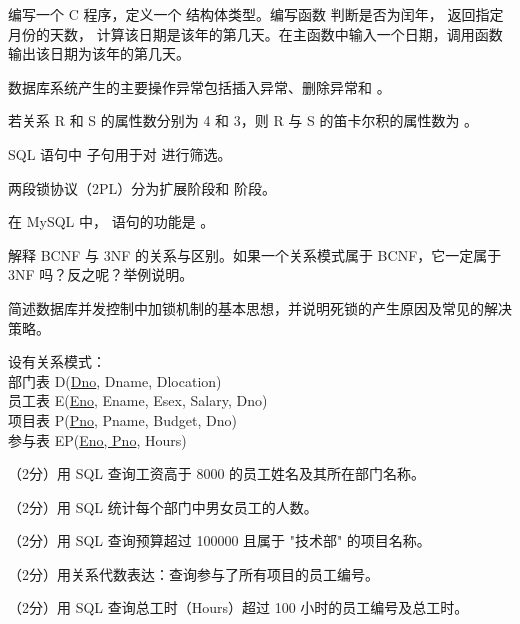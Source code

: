 \documentclass[a4paper,11pt]{article}
\begin{document}
\pq 编写一个 C 程序，定义一个  结构体类型。编写函数  判断是否为闰年， 返回指定月份的天数， 计算该日期是该年的第几天。在主函数中输入一个日期，调用函数输出该日期为该年的第几天。
\anslines{6cm}



\q 数据库系统产生的主要操作异常包括插入异常、删除异常和 \fillblank 。

\q 若关系 R 和 S 的属性数分别为 4 和 3，则 R 与 S 的笛卡尔积的属性数为 \fillblank 。

\q SQL 语句中  子句用于对 \fillblank 进行筛选。

\q 两段锁协议（2PL）分为扩展阶段和 \fillblank 阶段。

\q 在 MySQL 中， 语句的功能是 \fillblank 。


\q 解释 BCNF 与 3NF 的关系与区别。如果一个关系模式属于 BCNF，它一定属于 3NF 吗？反之呢？举例说明。
\anslines{3cm}

\q 简述数据库并发控制中加锁机制的基本思想，并说明死锁的产生原因及常见的解决策略。
\anslines{3cm}


设有关系模式：\\
部门表 D(\underline{Dno}, Dname, Dlocation)\\
员工表 E(\underline{Eno}, Ename, Esex, Salary, Dno)\\
项目表 P(\underline{Pno}, Pname, Budget, Dno)\\
参与表 EP(\underline{Eno, Pno}, Hours)

\q （2分）用 SQL 查询工资高于 8000 的员工姓名及其所在部门名称。
\anslines{0.8cm}

\q （2分）用 SQL 统计每个部门中男女员工的人数。
\anslines{0.8cm}

\q （2分）用 SQL 查询预算超过 100000 且属于 "技术部" 的项目名称。
\anslines{0.8cm}

\q （2分）用关系代数表达：查询参与了所有项目的员工编号。
\anslines{1.2cm}

\q （2分）用 SQL 查询总工时（Hours）超过 100 小时的员工编号及总工时。
\anslines{0.8cm}
\end{document}
